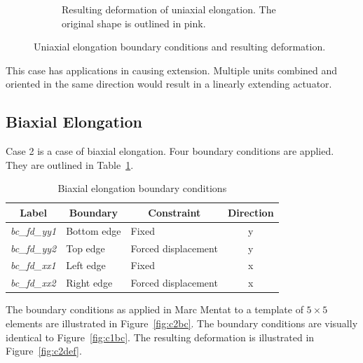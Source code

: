 \begin{figure}[H]
\begin{subfigure}[b]{0.4\textwidth}
		\caption{Resulting deformation of uniaxial elongation. The original shape is outlined in pink.}
		\label{fig:c1def}
	\end{subfigure}
	\caption[Uniaxial elongation boundary conditions and deformation]{Uniaxial elongation boundary conditions and resulting deformation.}
	\label{fig:c1}
\end{figure}

This case has applications in causing extension. Multiple units combined and oriented in the same direction would result in a linearly extending actuator.

\subsection{Biaxial Elongation}

Case 2 is a case of biaxial elongation. Four boundary conditions are applied. They are outlined in Table~\ref{tab:c2}.

\begin{table}[H]
\centering
\begin{tabular}{@{}lllc@{}}
\toprule
\multicolumn{1}{c}{\textbf{Label}} & \multicolumn{1}{c}{\textbf{Boundary}} & \multicolumn{1}{c}{\textbf{Constraint}} & \textbf{Direction} \\ \midrule
\textit{bc\_fd\_yy1} & Bottom edge & Fixed               & y \\
\textit{bc\_fd\_yy2} & Top edge    & Forced displacement & y \\
\textit{bc\_fd\_xx1} & Left edge   & Fixed               & x \\
\textit{bc\_fd\_xx2} & Right edge  & Forced displacement & x \\ \bottomrule
\end{tabular}
\caption{Biaxial elongation boundary conditions}
\label{tab:c2}
\end{table}

The boundary conditions as applied in Marc Mentat to a template of $5\times 5$ elements are illustrated in Figure~\ref{fig:c2bc}. The boundary conditions are visually identical to Figure~\ref{fig:c1bc}. The resulting deformation is illustrated in Figure~\ref{fig:c2def}.


